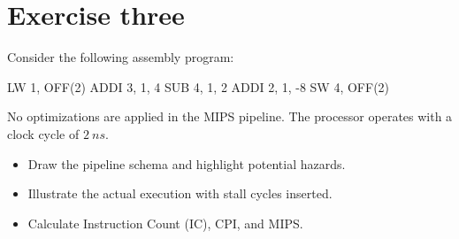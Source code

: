 \section{Exercise three}

Consider the following assembly program: 
\begin{verbnobox}[\verbarg]
LW 1, OFF(2)
ADDI 3, 1, 4
SUB 4, 1, 2
ADDI 2, 1, -8
SW 4, OFF(2)
\end{verbnobox}
No optimizations are applied in the MIPS pipeline. 
The processor operates with a clock cycle of $2\:ns$. 
\begin{itemize}
    \item Draw the pipeline schema and highlight potential hazards.
    \item Illustrate the actual execution with stall cycles inserted.
    \item Calculate Instruction Count (IC), CPI, and MIPS.\@
\end{itemize}

